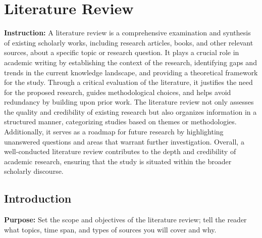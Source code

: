 \chapter{Literature Review}
\label{Literature Review}





{\color{red} \textbf{Instruction:} A literature review is a comprehensive examination and synthesis of existing scholarly works, including research articles, books, and other relevant sources, about a specific topic or research question. It plays a crucial role in academic writing by establishing the context of the research, identifying gaps and trends in the current knowledge landscape, and providing a theoretical framework for the study. Through a critical evaluation of the literature, it justifies the need for the proposed research, guides methodological choices, and helps avoid redundancy by building upon prior work. The literature review not only assesses the quality and credibility of existing research but also organizes information in a structured manner, categorizing studies based on themes or methodologies. Additionally, it serves as a roadmap for future research by highlighting unanswered questions and areas that warrant further investigation. Overall, a well-conducted literature review contributes to the depth and credibility of academic research, ensuring that the study is situated within the broader scholarly discourse.}











\section{Introduction}

{\color{blue}\textbf{Purpose:}
Set the scope and objectives of the literature review; tell the reader what topics, time span, and types of sources you will cover and why.} \\

